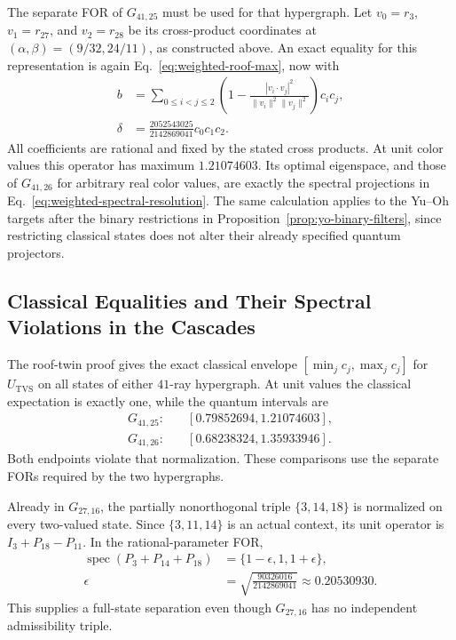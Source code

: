 \documentclass[aps,pra,reprint,superscriptaddress,longbibliography,nofootinbib,floatfix,10pt]{revtex4-2}
\theoremstyle{definition}\newtheorem{definition}[theorem]{Definition}
\theoremstyle{remark}\newtheorem{remark}[theorem]{Remark}
\begin{document}
The separate FOR of $G_{41,25}$ must be used for that hypergraph. Let $v_0=r_3$, $v_1=r_{27}$, and $v_2=r_{28}$ be its cross-product coordinates at $(\alpha,\beta)=(9/32,24/11)$, as constructed above. An exact equality for this representation is again Eq.~\eqref{eq:weighted-roof-max}, now with
\begin{equation}\label{eq:weighted-roof25-coefficients}
\begin{aligned}
b&=\sum_{0\le i<j\le2}\left(1-
\frac{|v_i\cdot v_j|^2}{\|v_i\|^2\|v_j\|^2}\right)c_ic_j,\\
\delta&=\frac{2052543025}{2142869041}c_0c_1c_2.
\end{aligned}
\end{equation}
All coefficients are rational and fixed by the stated cross products. At unit color values this operator has maximum $1.21074603$. Its optimal eigenspace, and those of $G_{41,26}$ for arbitrary real color values, are exactly the spectral projections in Eq.~\eqref{eq:weighted-spectral-resolution}. The same calculation applies to the Yu--Oh targets after the binary restrictions in Proposition~\ref{prop:yo-binary-filters}, since restricting classical states does not alter their already specified quantum projectors.

\subsection{Classical Equalities and Their Spectral Violations in the Cascades}\label{sec:classical-roofs}

The roof-twin proof gives the exact classical envelope $[\min_jc_j,\max_jc_j]$ for $U_{\mathrm{TVS}}$ on all states of either $41$-ray hypergraph. At unit values the classical expectation is exactly one, while the quantum intervals are
\begin{equation}\label{eq:classical-roof-intervals}
\begin{aligned}
G_{41,25}:&\quad[0.79852694,1.21074603],\\
G_{41,26}:&\quad[0.68238324,1.35933946].
\end{aligned}
\end{equation}
Both endpoints violate that normalization. These comparisons use the separate FORs required by the two hypergraphs.

Already in $G_{27,16}$, the partially nonorthogonal triple $\{3,14,18\}$ is normalized on every two-valued state. Since $\{3,11,14\}$ is an actual context, its unit operator is $I_3+P_{18}-P_{11}$. In the rational-parameter FOR,
\begin{equation}\label{eq:classical-G27-spectrum}
\begin{aligned}
\operatorname{spec}(P_3+P_{14}+P_{18})&=\{1-\epsilon,1,1+\epsilon\},\\
\epsilon&=\sqrt{\frac{90326016}{2142869041}}
\approx0.20530930.
\end{aligned}
\end{equation}
This supplies a full-state separation even though $G_{27,16}$ has no independent admissibility triple.
\end{document}
